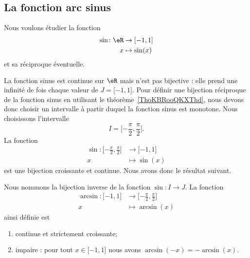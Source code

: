 \subsection{La fonction arc sinus}

Nous voulons étudier la fonction
\begin{equation}
	\begin{aligned}
		\sin\colon \eR & \to \mathopen[ -1 , 1 \mathclose] \\
		x              & \mapsto \sin(x)
	\end{aligned}
\end{equation}
et sa réciproque éventuelle.

La fonction sinus est continue sur \( \eR\) mais n'est pas bijective : elle prend une infinité de fois chaque valeur de \( J=\mathopen[ -1 , 1 \mathclose]\). Pour définir une bijection réciproque de la fonction sinus en utilisant le théorème~\ref{ThoKBRooQKXThd}, nous devons donc choisir un intervalle à partir duquel la fonction sinus est monotone. Nous choisissons l'intervalle
\begin{equation}
	I=\mathopen[ -\frac{ \pi }{ 2 } , \frac{ \pi }{2} \mathclose].
\end{equation}
La fonction
\begin{equation}
	\begin{aligned}
		\sin\colon \mathopen[ -\frac{ \pi }{2} , \frac{ \pi }{2} \mathclose] & \to \mathopen[ -1 , 1 \mathclose] \\
		x                                                                    & \mapsto \sin(x)
	\end{aligned}
\end{equation}
est une bijection croissante et continue. Nous avons donc le résultat suivant.
\begin{theorem}
	Nous nommons  la bijection inverse de la fonction \( \sin\colon I\to J\). La fonction
	\begin{equation}
		\begin{aligned}
			\arcsin\colon \mathopen[ -1 , 1 \mathclose] & \to \mathopen[ -\frac{ \pi }{2} , \frac{ \pi }{2} \mathclose] \\
			x                                           & \mapsto \arcsin(x)
		\end{aligned}
	\end{equation}
	ainsi définie est
	\begin{enumerate}
		\item
		      continue et strictement croissante;
		\item
		      impaire : pour tout \( x\in\mathopen[ -1 , 1 \mathclose]\) nous avons \( \arcsin(-x)=-\arcsin(x)\).
	\end{enumerate}
\end{theorem}

